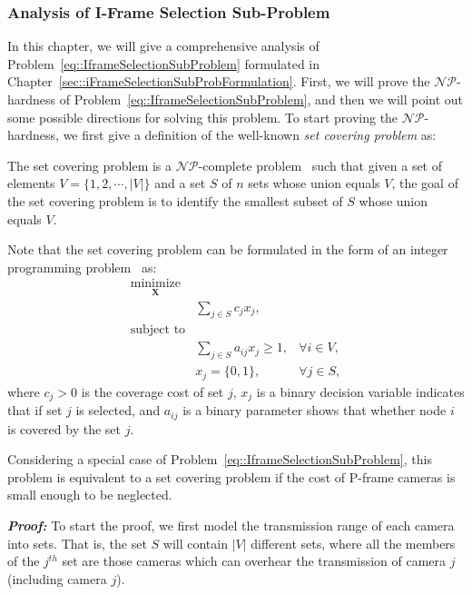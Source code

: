\subsubsection{Analysis of I-Frame Selection Sub-Problem}
In this chapter, we will give a comprehensive analysis of Problem~\eqref{eq::IframeSelectionSubProblem} formulated in Chapter~\ref{sec::iFrameSelectionSubProbFormulation}.
First, we will prove the $\mathcal{NP}$-hardness of Problem~\eqref{eq::IframeSelectionSubProblem}, and then we will point out some possible directions for solving this problem.
To start proving the $\mathcal{NP}$-hardness, we first give a definition of the well-known \emph{set covering problem} as:
\begin{mydef}
The set covering problem is a $\mathcal{NP}$-complete problem~\cite{SetCoveringNPComplete} such that given a set of elements $V = \{1,2,\cdots,|V|\}$ and a set $S$ of $n$ sets whose union equals $V$, the goal of the set covering problem is to identify the smallest subset of $S$ whose union equals $V$.
\label{def::SCP}
\end{mydef}
Note that the set covering problem can be formulated in the form of an integer programming problem~\cite{SetCoveringFormulation} as:
\begin{align}
\underset{\mathbf{X}}{\text{minimize}} & & \nonumber \\
 &\sum_{j \in S} c_j x_j, & \nonumber \\
\text{subject to} & & \nonumber \\
 &\sum_{j \in S} a_{ij}x_j \geq 1, &\forall i \in V, \nonumber \\
 &x_{j} = \{0,1\}, &\forall j \in S,
\label{eq::SetCoveringProblemFormualtion}
\end{align}
where $c_j > 0$ is the coverage cost of set $j$, $x_j$ is a binary decision variable indicates that if set $j$ is selected, and $a_{ij}$ is a binary parameter shows that whether node $i$ is covered by the set $j$.
\begin{mylem}
Considering a special case of Problem~\eqref{eq::IframeSelectionSubProblem}, this problem is equivalent to a set covering problem if the cost of P-frame cameras is small enough to be neglected.
\label{lemma::ReduceProb}
\end{mylem}
\textbf{\emph{Proof:}}
To start the proof, we first model the transmission range of each camera into sets.
That is, the set $S$ will contain $|V|$ different sets, where all the members of the $j^{th}$ set are those cameras which can overhear the transmission of camera $j$ (including camera $j$).
